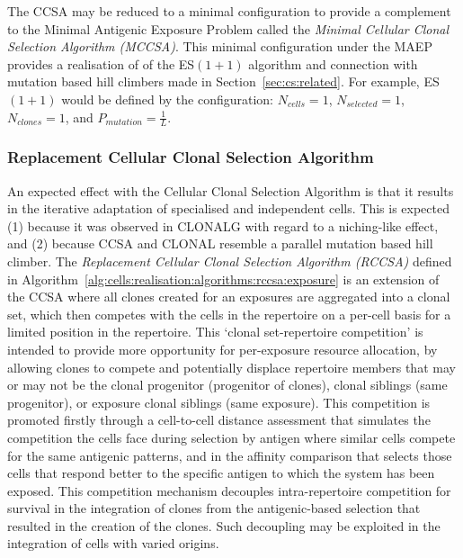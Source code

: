 The CCSA may be reduced to a minimal configuration to provide a complement to the Minimal Antigenic Exposure Problem called the \emph{Minimal Cellular Clonal Selection Algorithm (MCCSA)}. This minimal configuration under the MAEP provides a realisation of of the ES$(1+1)$ algorithm and connection with mutation based hill climbers made in Section~\ref{sec:cs:related}. For example, ES$(1+1)$ would be defined by the configuration: $N_{cells}=1$, $N_{selected}=1$, $N_{clones}=1$, and $P_{mutation}=\frac{1}{L}$.

%
%
\subsubsection{Replacement Cellular Clonal Selection Algorithm}
An expected effect with the Cellular Clonal Selection Algorithm is that it results in the iterative adaptation of specialised and independent cells. This is expected (1) because it was observed in CLONALG with regard to a niching-like effect, and (2) because CCSA and CLONAL resemble a parallel mutation based hill climber. The \emph{Replacement Cellular Clonal Selection Algorithm (RCCSA)} defined in Algorithm~\ref{alg:cells:realisation:algorithms:rccsa:exposure} is an extension of the CCSA where all clones created for an exposures are aggregated into a clonal set, which then competes with the cells in the repertoire on a per-cell basis for a limited position in the repertoire. This `clonal set-repertoire competition' is intended to provide more opportunity for per-exposure resource allocation, by allowing clones to compete and potentially displace repertoire members that may or may not be the clonal progenitor (progenitor of clones), clonal siblings (same progenitor), or exposure clonal siblings (same exposure). This competition is promoted firstly through a cell-to-cell distance assessment that simulates the competition the cells face during selection by antigen where similar cells compete for the same antigenic patterns, and in the affinity comparison that selects those cells that respond better to the specific antigen to which the system has been exposed. This competition mechanism decouples intra-repertoire competition for survival in the integration of clones from the antigenic-based selection that resulted in the creation of the clones. Such decoupling may be exploited in the integration of cells with varied origins. 

